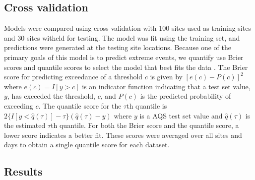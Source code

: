 \documentclass[11pt]{article}
\begin{document}
\subsection{Cross validation}\label{s:modelselect}
Models were compared using cross validation with 100 sites used as training sites and 30 sites witheld for testing.
The model was fit using the training set, and predictions were generated at the testing site locations.
Because one of the primary goals of this model is to predict extreme events, we quantify use Brier scores and quantile scores to select the model that best fits the data \citep{Gneiting2007}.
The Brier score for predicting exceedance of a threshold $c$ is given by $[e(c) - P(c)]^2$ where $e(c) = I[y>c]$ is an indicator function indicating that a test set value, $y$, has exceeded the threshold, $c$, and $P(c)$ is the predicted probability of exceeding $c$.
The quantile score for the $\tau$th quantile is $2\{ I[y < \widehat{q}(\tau)] - \tau\} (\widehat{q}(\tau) - y)$ where $y$ is a AQS test set value and $\widehat{q}(\tau)$ is the estimated $\tau$th quantile.
For both the Brier score and the quantile score, a lower score indicates a better fit.
These scores were averaged over all sites and days to obtain a single quantile score for each dataset.

\subsection{Results}\label{s:simresults}
\end{document}
